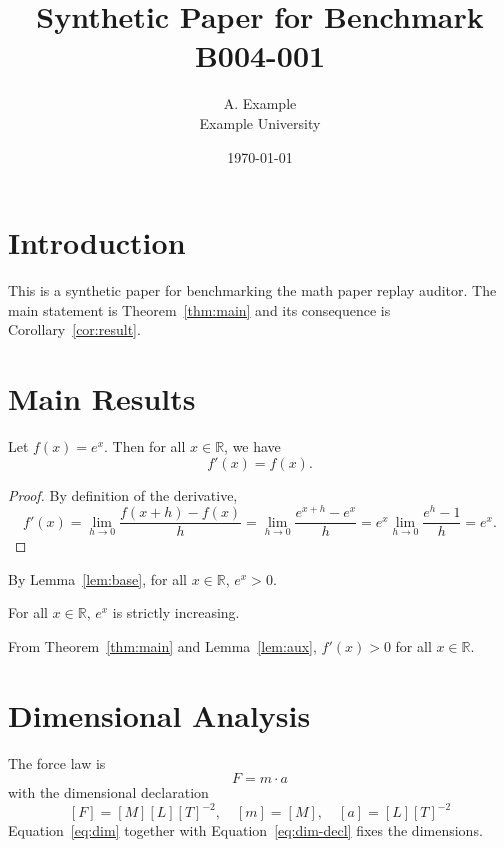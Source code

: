 \documentclass{article}
\title{Synthetic Paper for Benchmark B004-001}
\author{A. Example \\ Example University}
\date{\today}
\begin{document}
\maketitle

\section{Introduction}
This is a synthetic paper for benchmarking the math paper replay auditor.
The main statement is Theorem~\ref{thm:main} and its consequence is
Corollary~\ref{cor:result}.

\section{Main Results}
\begin{theorem}
Let $f(x) = e^x$. Then for all $x \in \mathbb{R}$, we have
\begin{equation}
\label{eq:main}
f'(x) = f(x).
\end{equation}
\end{theorem}

\begin{proof}
By definition of the derivative,
\begin{equation}
\label{eq:deriv}
f'(x) = \lim_{h \to 0} \frac{f(x+h) - f(x)}{h} = \lim_{h \to 0} \frac{e^{x+h} - e^x}{h} = e^x \lim_{h \to 0} \frac{e^h - 1}{h} = e^x.
\end{equation}
\end{proof}

\begin{lemma}
\label{lem:aux}
By Lemma~\ref{lem:base}, for all $x \in \mathbb{R}$, $e^x > 0$.
\end{lemma}

\begin{lemma}
\label{lem:base}
For all $x \in \mathbb{R}$, $e^x$ is strictly increasing.
\end{lemma}

\begin{corollary}
\label{cor:result}
From Theorem~\ref{thm:main} and Lemma~\ref{lem:aux}, $f'(x) > 0$ for all $x \in \mathbb{R}$.
\end{corollary}

\section{Dimensional Analysis}
The force law is
\begin{equation}
\label{eq:dim}
F = m \cdot a
\end{equation}
with the dimensional declaration
\begin{equation}
\label{eq:dim-decl}
[F] = [M][L][T]^{-2}, \quad [m] = [M], \quad [a] = [L][T]^{-2}
\end{equation}
Equation~\ref{eq:dim} together with Equation~\ref{eq:dim-decl} fixes the dimensions.
\end{document}

